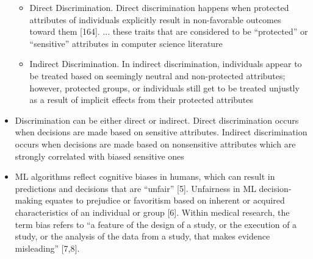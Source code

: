 \documentclass[12pt, a4paper, oneside]{book}   	%
\begin{document}
\begin{itemize}
				\begin{itemize}
					\item Direct Discrimination. Direct discrimination happens when protected attributes of individuals explicitly result in non-favorable outcomes toward them [164]. ... these traits that are considered to be “protected” or “sensitive” attributes in computer science literature  \autocite{Mehrabi_2021}
					\item Indirect Discrimination. In indirect discrimination, individuals appear to be treated based on seemingly neutral and non-protected attributes; however, protected groups, or individuals still get to be treated unjustly as a result of implicit effects from their protected attributes \autocite{Mehrabi_2021}
				\end{itemize}
				\item Discrimination can be either direct or indirect. Direct discrimination occurs when decisions are made based on sensitive attributes. Indirect discrimination occurs when decisions are made based on nonsensitive attributes which are strongly correlated with biased sensitive ones \autocite{M62_Hajian_2013}
				\item \gls{ML} algorithms reflect cognitive biases in humans, which can result in predictions and decisions that are “unfair” [5]. Unfairness in \gls{ML} decision-making equates to prejudice or favoritism based on inherent or acquired characteristics of an individual or group [6]. Within medical research, the term bias refers to “a feature of the design of a study, or the execution of a study, or the analysis of the data from a study, that makes evidence misleading” [7,8]. \autocite{Montonaya_2025}
			\end{itemize}
		
		
\end{document}
